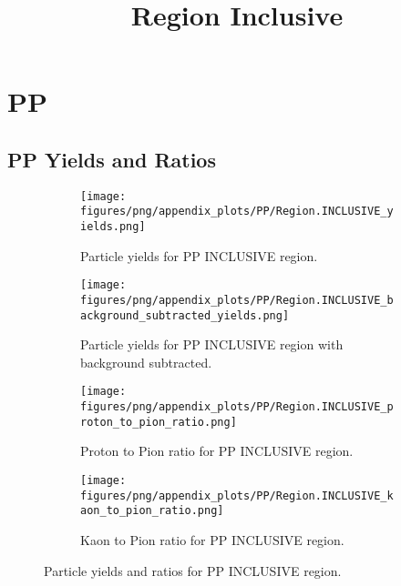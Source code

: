 
        \section{PP}
        
                \subsection{PP Yields and Ratios}
                \begin{figure}[H]
                    \title{Region Inclusive}
                    \begin{subfigure}[b]{0.5\textwidth}
                        \centering
                        \texttt{[image: figures/png/appendix\_plots/PP/Region.INCLUSIVE\_yields.png]}
                        \caption{Particle yields for PP INCLUSIVE region.}
                        \label{fig:appendix_PP_INCLUSIVE_Inclusive_Yields}
                    \end{subfigure}
                    \begin{subfigure}[b]{0.5\textwidth}
                        \centering
                        \texttt{[image: figures/png/appendix\_plots/PP/Region.INCLUSIVE\_background\_subtracted\_yields.png]}
                        \caption{Particle yields for PP INCLUSIVE region with background subtracted.}
                        \label{fig:appendix_PP_INCLUSIVE_Inclusive_Yields_Background_Subtracted}
                    \end{subfigure}
                    \begin{subfigure}[b]{0.5\textwidth}
                        \centering
                        \texttt{[image: figures/png/appendix\_plots/PP/Region.INCLUSIVE\_proton\_to\_pion\_ratio.png]}
                        \caption{Proton to Pion ratio for PP INCLUSIVE region.}
                        \label{fig:appendix_PP_INCLUSIVE_Proton_to_Pion_Ratio}
                    \end{subfigure}
                    \begin{subfigure}[b]{0.5\textwidth}
                        \centering
                        \texttt{[image: figures/png/appendix\_plots/PP/Region.INCLUSIVE\_kaon\_to\_pion\_ratio.png]}
                        \caption{Kaon to Pion ratio for PP INCLUSIVE region.}
                        \label{fig:appendix_PP_INCLUSIVE_Kaon_to_Pion_Ratio}
                    \end{subfigure}
                    \caption{Particle yields and ratios for PP INCLUSIVE region.}
                    \label{fig:appendix_PP_INCLUSIVE_Inclusive_Yields_and_Ratios}
                \end{figure}
